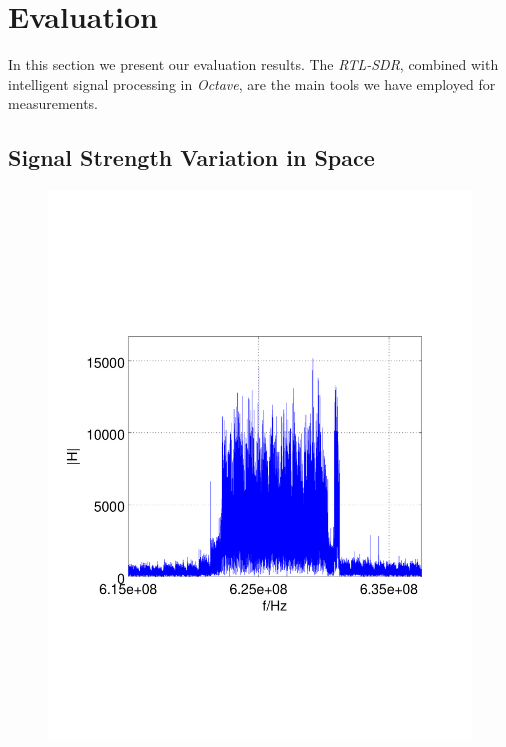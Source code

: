 \documentclass[conference]{IEEEtran}
\begin{document}
\section{Evaluation}
In this section we present our evaluation results. The \textit{RTL-SDR},
combined with intelligent signal processing in \textit{Octave}, are the
main tools we have employed for measurements. 

\subsection{Signal Strength Variation in Space}
\begin{figure}[h]
	\centering
	\begin{minipage}{0.49\columnwidth}
	\includegraphics[width=\columnwidth]{./fig/626mhz_raw}
	\end{minipage}
	\hfill
	\begin{minipage}{0.49\columnwidth}

\end{minipage}
\end{figure}
\end{document}
